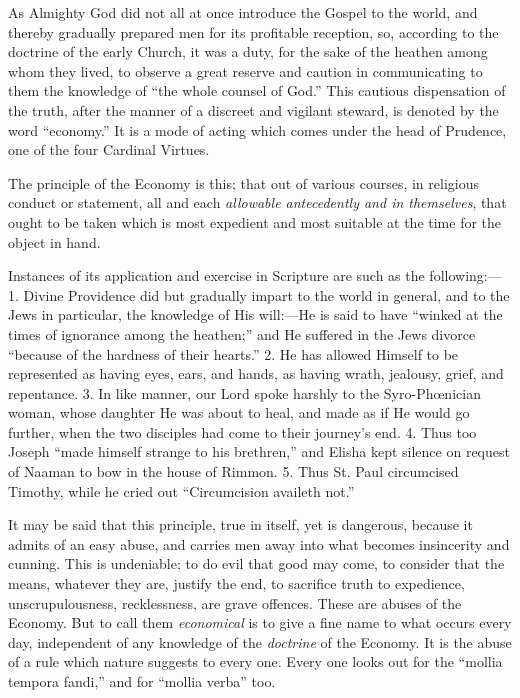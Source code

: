 As Almighty God did not all at once introduce the Gospel to the
world, and thereby gradually prepared men for its profitable reception,
so, according to the doctrine of the early Church, it was a duty, for
the sake of the heathen among whom they lived, to observe a great
reserve and caution in communicating to them the knowledge of ``the
whole counsel of God.'' This cautious dispensation of the truth,
after the manner of a discreet and vigilant steward, is denoted by the
word ``economy.'' It is a mode of acting which comes under the
head of Prudence, one of the four Cardinal Virtues.

The principle of the Economy is this; that out of various courses, in
religious conduct or statement, all and each \emph{allowable antecedently
and in themselves}, that ought to be taken which is most expedient
and most suitable at the time for the object in hand.

Instances of its application and exercise in Scripture are such as
the following:—1. Divine Providence did but gradually impart to the
world in general, and to the Jews in particular, the knowledge of His
will:—He is said to have ``winked at the times of ignorance among
the heathen;'' and He suffered in the Jews divorce ``because of
the hardness of their hearts.'' 2. He has allowed Himself to be
represented as having eyes, ears, and hands, as having wrath, jealousy,
grief, and repentance. 3. In like manner, our Lord spoke harshly to the
Syro-Phœnician woman, whose daughter He was about to heal, and made as
if He would go further, when the two disciples had come to their
journey's end. 4. Thus too Joseph ``made himself strange to his
brethren,'' and Elisha kept silence on request of Naaman to bow in
the house of Rimmon. 5. Thus St. Paul circumcised Timothy, while he
cried out ``Circumcision availeth not.''

It may be said that this principle, true in itself, yet is dangerous,
because it admits of an easy abuse, and carries men away into what
becomes insincerity and cunning. This is undeniable; to do evil that
good may come, to consider that the means, whatever they are, justify
the end, to sacrifice truth to expedience, unscrupulousness,
recklessness, are grave offences. These are abuses of the Economy. But
to call them \emph{economical} is to give a fine name to what occurs
every day, independent of any knowledge of the \emph{doctrine} of the
Economy. It is the abuse of a rule which nature suggests to every one.
Every one looks out for the ``mollia tempora fandi,'' and for ``mollia verba'' too.

